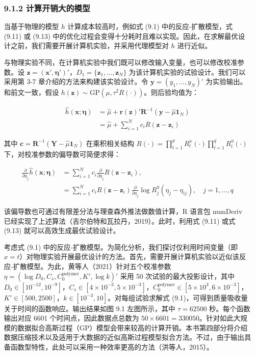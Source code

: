 \documentclass{ctexart}
\begin{document}
\subsubsection*{9.1.2 计算开销大的模型}

当基于物理的模型 $h$ 计算成本较高时，例如式 (9.1) 中的反应‑扩散模型，式 (9.11) 或 (9.13) 中的优化过程会变得十分耗时且难以实现。因此，在求解最优设计之前，我们需要开展计算机实验，并采用代理模型对 $h$ 进行近似。

与物理实验不同，在计算机实验中我们既可以修改输入变量，也可以修改校准参数。设 $\boldsymbol{z}=(\boldsymbol{x}',\boldsymbol{\eta}')'$，$D_1=\{\boldsymbol{z}_1,\dots,\boldsymbol{z}_N\}$ 为该计算机实验的试验设计。我们可以采用第 3‑7 章介绍的方法来构建该实验设计。令 $\boldsymbol{y}=(y_1,\dots,y_N)'$ 为实验输出。和前文一致，假设 $h(\boldsymbol{z})\sim\mathrm{GP}(\mu,\tau^2R(\cdot))$。则后验均值为：

\begin{align*}
\widehat{h}(\boldsymbol{x};\boldsymbol{\eta})&=\widehat{\mu}+\boldsymbol{r}(\boldsymbol{z})'\boldsymbol{R}^{-1}(\boldsymbol{y}-\widehat{\mu}\boldsymbol{1}_N)\\
&=\widehat{\mu}+\sum_{i=1}^{N}c_iR(\boldsymbol{z}-\boldsymbol{z}_i)
\end{align*}

其中 $\boldsymbol{c}=\boldsymbol{R}^{-1}(\boldsymbol{Y}-\widehat{\mu}\boldsymbol{1}_N)$ 在乘积相关结构 $R(\cdot)=\prod_{l=1}^{p}R_l^x(\cdot)\prod_{l=1}^{q}R_l^{\eta}(\cdot)$ 下，对校准参数的偏导数可简便求得：

\begin{align*}
\frac{\partial}{\partial\eta_j}\widehat{h}(\boldsymbol{x};\boldsymbol{\eta})&=\sum_{i=1}^{N}c_i\frac{\partial}{\partial\eta_j}R(\boldsymbol{z}-\boldsymbol{z}_i),\\
&=\sum_{i=1}^{N}c_iR(\boldsymbol{z}-\boldsymbol{z}_i)\frac{\partial}{\partial\eta_j}\log R_j^{\eta}(\eta_j-\eta_{ij}),\quad j=1,\dots,q
\end{align*}

该偏导数也可通过有限差分法与理查森外推法做数值计算，R 语言包 numDeriv 已经实现了上述算法（吉尔伯特和瓦拉丹，2019）。此时，利用式 (9.11) 或式 (9.13) 就可以高效生成最优试验设计。

考虑式 (9.1) 中的反应‑扩散模型。为简化分析，我们探讨仅利用时间变量（即 $x=t$）对物理实验开展最优设计的方法。首先，需要开展计算机实验以近似该反应‑扩散模型。为此，黄等人（2021）针对五个校准参数 $\eta=(\log D_0,C_s,C_0^\text{polymer},K',\log k)'$ 采用 50 次试验的最大投影设计，其中 $D_0\in[10^{-12},10^{-9}]$，$C_s\in[4\times10^{-3},5\times10^{-3}]$，$C_0^\text{polymer}\in[5\times10^{3},6\times10^{-3}]$，$K'\in[500,2500]$，$k\in[10^{-3},10]$。对每组试验求解式 (9.1)，可得到质量吸收量关于时间的函数响应。输出结果如图 9.1 左图所示，其中 $\tau=62500$ 秒。每个函数输出对应 6601 个时间点，因此数据点总数为 $50\times6601=330050$。针对如此大规模的数据拟合高斯过程（GP）模型会带来较高的计算开销。本书第四部分将介绍数据压缩技术以及适用于大数据的近似高斯过程模型拟合方法。不过，由于输出具备函数型特性，此处可以采用一种效率更高的方法（洪等人，2015）。
\end{document}
